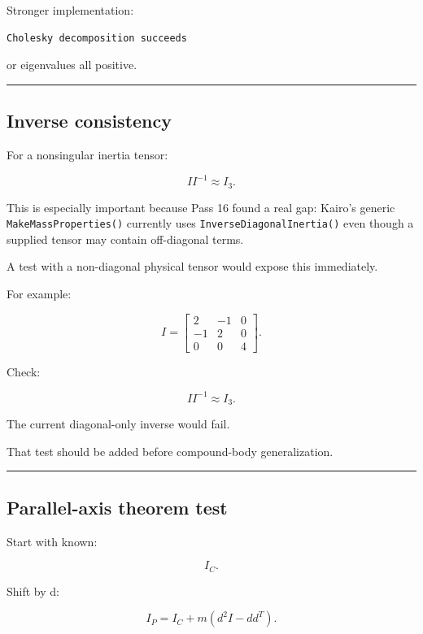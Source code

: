 Stronger implementation:

\begin{verbatim}
Cholesky decomposition succeeds
\end{verbatim}

or eigenvalues all positive.

\begin{center}\rule{0.5\linewidth}{0.5pt}\end{center}

\subsection{Inverse consistency}\label{06-engine-ii-ch039-inverse-consistency}

For a nonsingular inertia tensor:

\[
\boxed{
II^{-1}\approx I_3.
}
\]

This is especially important because Pass 16 found a real gap: Kairo's generic \texttt{MakeMassProperties()} currently uses \texttt{InverseDiagonalInertia()} even though a supplied tensor may contain off-diagonal terms.

A test with a non-diagonal physical tensor would expose this immediately.

For example:

\[
I=
\begin{bmatrix}
2&-1&0\\
-1&2&0\\
0&0&4
\end{bmatrix}.
\]

Check:

\[
II^{-1}\approx I_3.
\]

The current diagonal-only inverse would fail.

That test should be added before compound-body generalization.

\begin{center}\rule{0.5\linewidth}{0.5pt}\end{center}

\subsection{Parallel-axis theorem test}\label{06-engine-ii-ch039-parallel-axis-theorem-test}

Start with known:

\[
I_C.
\]

Shift by d:

\[
I_P
=
I_C+
m(d^2I-dd^T).
\]

